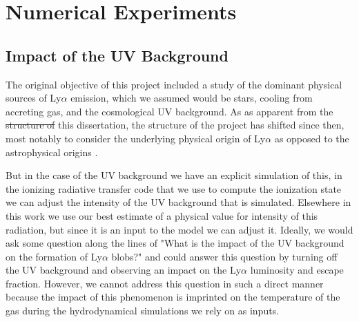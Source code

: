 \chapter{Numerical Experiments}
\label{sec:experiments}

\section{Impact of the UV Background}
The original objective of this project included a study of the dominant physical sources of Ly$\alpha$ emission, which we assumed would be stars, cooling from accreting gas, and the cosmological UV background.
As as apparent from the  \sout{structure of} this dissertation, the structure of the project has shifted since then, most notably to consider the underlying physical origin of Ly$\alpha$ as opposed to the astrophysical origins .

But in the case of the UV background we have an explicit simulation of this, in the ionizing radiative transfer code that we use to compute the ionization state we can adjust the intensity of the UV background that is simulated.
Elsewhere in this work we use our best estimate of a physical value for intensity of this radiation, but since it is an input to the model we can adjust it.
Ideally, we would ask some question along the lines of "What is the impact of the UV background on the formation of Ly$\alpha$ blobs?" and could answer this question by turning off the UV background and observing an impact on the Ly$\alpha$ luminosity and escape fraction.
However, we cannot address this question in such a direct manner because the impact of this phenomenon is imprinted on the temperature of the gas during the hydrodynamical simulations we rely on as inputs.

